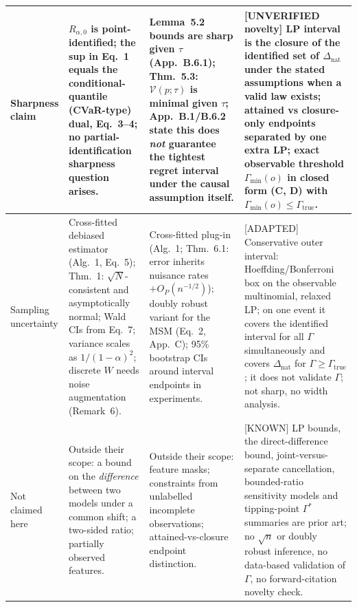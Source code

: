 \begin{tabular}{p{} p{} p{} p{}}
\midrule
Sharpness claim &
$R_{\alpha,0}$ is point-identified; the sup in Eq.~1 equals the conditional-quantile (CVaR-type) dual, Eq.~3--4; no partial-identification sharpness question arises. &
Lemma~5.2 bounds are sharp given $\tau$ (App.~B.6.1); Thm.~5.3: $\mathcal{V}(p;\tau)$ is minimal given $\tau$; App.~B.1/B.6.2 state this does \emph{not} guarantee the tightest regret interval under the causal assumption itself. &
[UNVERIFIED novelty] LP interval is the closure of the identified set of $\Delta_{\mathrm{nat}}$ under the stated assumptions when a valid law exists; attained vs closure-only endpoints separated by one extra LP; exact observable threshold $\Gamma_{\min}(o)$ in closed form (C, D) with $\Gamma_{\min}(o)\le\Gamma_{\mathrm{true}}$. \\
\midrule
Sampling uncertainty &
Cross-fitted debiased estimator (Alg.~1, Eq.~5); Thm.~1: $\sqrt{N}$-consistent and asymptotically normal; Wald CIs from Eq.~7; variance scales as $1/(1-\alpha)^2$; discrete $W$ needs noise augmentation (Remark~6). &
Cross-fitted plug-in (Alg.~1; Thm.~6.1: error inherits nuisance rates $+O_P(n^{-1/2})$); doubly robust variant for the MSM (Eq.~2, App.~C); 95\% bootstrap CIs around interval endpoints in experiments. &
[ADAPTED] Conservative outer interval: Hoeffding/Bonferroni box on the observable multinomial, relaxed LP; on one event it covers the identified interval for all $\Gamma$ simultaneously and covers $\Delta_{\mathrm{nat}}$ for $\Gamma\ge\Gamma_{\mathrm{true}}$; it does not validate $\Gamma$; not sharp, no width analysis. \\
\midrule
Not claimed here &
Outside their scope: a bound on the \emph{difference} between two models under a common shift; a two-sided ratio; partially observed features. &
Outside their scope: feature masks; constraints from unlabelled incomplete observations; attained-vs-closure endpoint distinction. &
[KNOWN] LP bounds, the direct-difference bound, joint-versus-separate cancellation, bounded-ratio sensitivity models and tipping-point $\Gamma^*$ summaries are prior art; no $\sqrt{n}$ or doubly robust inference, no data-based validation of $\Gamma$, no forward-citation novelty check. \\
\bottomrule
\end{tabular}
